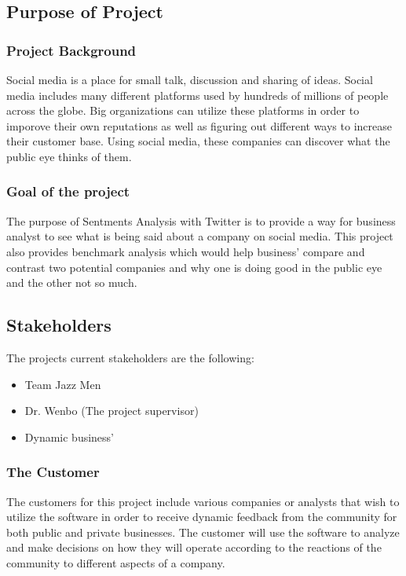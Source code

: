 \documentclass[12pt]{article}
\begin{document}
\subsection{Purpose of Project} %
\subsubsection{Project Background}
Social media is a place for small talk, discussion and sharing of ideas. Social media includes many different platforms used by hundreds of millions of people across the globe. Big organizations can utilize these platforms in order to imporove their own reputations as well as figuring out different ways to increase their customer base. Using social media, these companies can discover what the public eye thinks of them.\\

\subsubsection{Goal of the project}
The purpose of Sentments Analysis with Twitter is to provide a way for
business analyst to see what is being said about a company on social media. This project also provides benchmark analysis which would help business' compare and contrast two potential companies and why one is doing good in the public eye and the other not so much.

\subsection{Stakeholders}\label{SubSec_Stakeholders} %
The projects current stakeholders are the following:
\begin{itemize}
\item Team Jazz Men
\item Dr. Wenbo (The project supervisor)
\item Dynamic business'
\end{itemize}
	
\subsubsection{The Customer}
The customers for this project include various companies or analysts that wish to utilize the software in order to receive dynamic feedback from the community for both public and private businesses. The customer will use the software to analyze and make decisions on how they will operate according to the reactions of the community to different aspects of a company.
\end{document}

